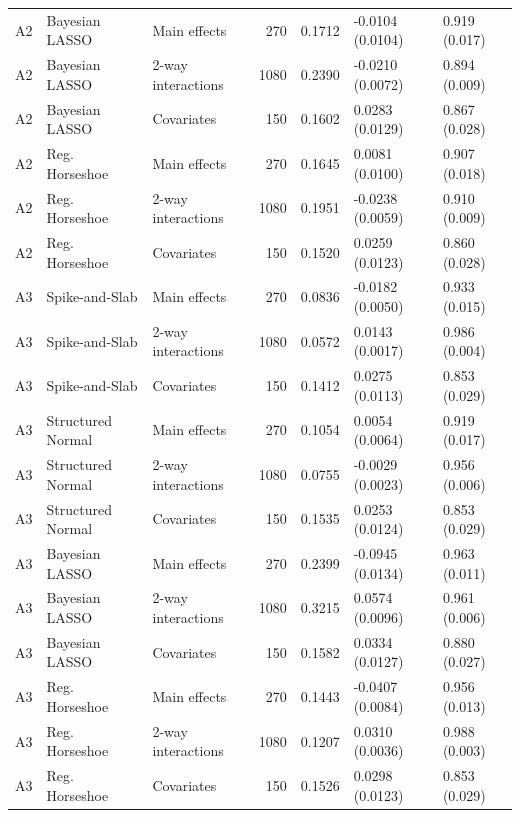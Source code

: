 \begin{tabular}{lllrlll}
  A2 & Bayesian LASSO & Main effects & 270 & 0.1712 & -0.0104 (0.0104) & 0.919 (0.017) \\ 
  A2 & Bayesian LASSO & 2-way interactions & 1080 & 0.2390 & -0.0210 (0.0072) & 0.894 (0.009) \\ 
  A2 & Bayesian LASSO & Covariates & 150 & 0.1602 & 0.0283 (0.0129) & 0.867 (0.028) \\ 
  A2 & Reg. Horseshoe & Main effects & 270 & 0.1645 & 0.0081 (0.0100) & 0.907 (0.018) \\ 
  A2 & Reg. Horseshoe & 2-way interactions & 1080 & 0.1951 & -0.0238 (0.0059) & 0.910 (0.009) \\ 
  A2 & Reg. Horseshoe & Covariates & 150 & 0.1520 & 0.0259 (0.0123) & 0.860 (0.028) \\ 
  A3 & Spike-and-Slab & Main effects & 270 & 0.0836 & -0.0182 (0.0050) & 0.933 (0.015) \\ 
  A3 & Spike-and-Slab & 2-way interactions & 1080 & 0.0572 & 0.0143 (0.0017) & 0.986 (0.004) \\ 
  A3 & Spike-and-Slab & Covariates & 150 & 0.1412 & 0.0275 (0.0113) & 0.853 (0.029) \\ 
  A3 & Structured Normal & Main effects & 270 & 0.1054 & 0.0054 (0.0064) & 0.919 (0.017) \\ 
  A3 & Structured Normal & 2-way interactions & 1080 & 0.0755 & -0.0029 (0.0023) & 0.956 (0.006) \\ 
  A3 & Structured Normal & Covariates & 150 & 0.1535 & 0.0253 (0.0124) & 0.853 (0.029) \\ 
  A3 & Bayesian LASSO & Main effects & 270 & 0.2399 & -0.0945 (0.0134) & 0.963 (0.011) \\ 
  A3 & Bayesian LASSO & 2-way interactions & 1080 & 0.3215 & 0.0574 (0.0096) & 0.961 (0.006) \\ 
  A3 & Bayesian LASSO & Covariates & 150 & 0.1582 & 0.0334 (0.0127) & 0.880 (0.027) \\ 
  A3 & Reg. Horseshoe & Main effects & 270 & 0.1443 & -0.0407 (0.0084) & 0.956 (0.013) \\ 
  A3 & Reg. Horseshoe & 2-way interactions & 1080 & 0.1207 & 0.0310 (0.0036) & 0.988 (0.003) \\ 
  A3 & Reg. Horseshoe & Covariates & 150 & 0.1526 & 0.0298 (0.0123) & 0.853 (0.029) \\ 
   \hline
\end{tabular}
